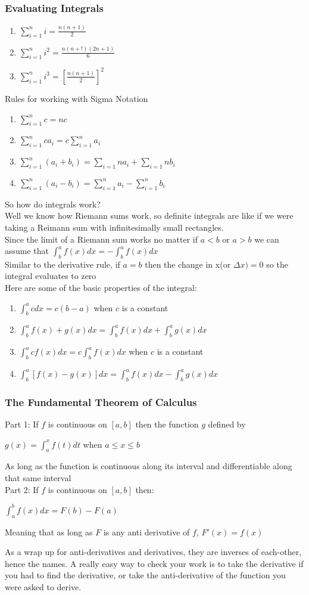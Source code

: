 \documentclass[10pt,a4paper]{article}
\begin{document}
		\subsubsection{Evaluating Integrals}
			\begin{enumerate}
				\item $\sum_{i=1}^{n}{i} = \frac{n(n+1)}{2}$
				\item $\sum_{i=1}^{n}{i^{2}} = \frac{n(n+!)(2n+1)}{6}$
				\item $\sum_{i=1}^{n}{i^{3}} = [\frac{n(n+1)}{2}]^{2}$
			\end{enumerate}
				Rules for working with Sigma Notation
					\begin{enumerate}
						\item $\sum_{i=1}^{n}{c} = nc$
						\item $\sum_{i=1}^{n}{ca_{i}} = c\sum_{i=1}^{n}{a_{i}}$
						\item $\sum_{i=1}^{n}{(a_{i}+b_{i})} = \sum_{i=1}{n}{a_{i}} + \sum_{i=1}{n}{b_{i}}$
						\item $\sum_{i=1}^{n}{(a_{i}-b_{i})} = \sum_{i=1}^{n}{a_{i}} - \sum_{i=1}^{n}{b_{i}}$
					\end{enumerate}
			So how do integrals work?
\\			Well we know how Riemann sums work, so definite integrals are like if we were taking a Reimann sum with infinitesimally small rectangles.
\\ 			Since the limit of a Riemann sum works no matter if $a<b$ or $a>b$ we can assume that $\int_{b}^{a}{f(x)dx} = -\int_{b}^{a}{f(x)dx}$
\\			Similar to the derivative rule, if $a=b$ then the change in x(or $\Delta{x})=0$ so the integral evaluates to zero
\\			Here are some of the basic properties of the integral:
			\begin{enumerate}
				\item $\int_{b}^{a}{c dx} = c(b-a)$ when $c$ is a constant
				\item $\int_{b}^{a}{f(x)+g(x)}dx = \int_{b}^{a}{f(x)dx} + \int_{b}^{a}{g(x)dx}$
				\item $\int_{b}^{a}{cf(x)dx} = c\int_{b}^{a}{f(x)dx}$ when $c$ is a constant
				\item $\int_{b}^{a}{[f(x)-g(x)]dx} = \int_{b}^{a}{f(x)dx} - \int_{b}^{a}{g(x)dx}$
			\end{enumerate}
	\subsubsection{The Fundamental Theorem of Calculus}
		Part 1: If $f$ is continuous on $[a,b]$ then the function $g$ defined by
		\begin{center}
			$g(x) = \int_{a}^{x}{f(t)dt}$ when $a \leq x \leq b$
		\end{center}
		As long as the function is continuous along its interval and differentiable along that same interval
\\		Part 2: If $f$ is continuous on $[a,b]$ then: 
		\begin{center}
			$\int_{a}^{b}{f(x)dx} = F(b) - F(a)$
		\end{center}
 		Meaning that as long as $F$ is any anti derivative of $f$, $F'(x) = f(x)$

As a wrap up for anti-derivatives and derivatives, they are inverses of each-other, hence the names. A really easy way to check your work is to take the derivative if you had to find the derivative, or take the anti-derivative of the function you were asked to derive.
	
\end{document}
